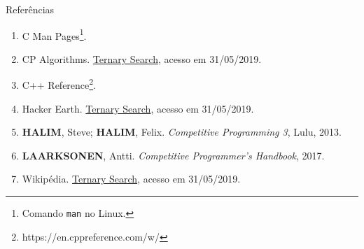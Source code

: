 \begin{frame}[fragile]{Referências}

    \begin{enumerate}
        \item C Man Pages\footnote{Comando \texttt{man} no Linux.}.

        \item CP Algorithms. \href{https://cp-algorithms.com/num_methods/ternary_search.html}{Ternary Search}, acesso em 31/05/2019.

		\item C++ Reference\footnote{https://en.cppreference.com/w/}.

        \item Hacker Earth. \href{https://www.hackerearth.com/pt-br/practice/algorithms/searching/ternary-search/tutorial/}{Ternary Search}, acesso em 31/05/2019.

        \item \textbf{HALIM}, Steve; \textbf{HALIM}, Felix. \textit{Competitive Programming 3}, Lulu, 2013.

        \item \textbf{LAARKSONEN}, Antti. \textit{Competitive Programmer's Handbook}, 2017.

        \item Wikipédia. \href{https://en.wikipedia.org/wiki/Ternary_search}{Ternary Search}, acesso em 31/05/2019.
    \end{enumerate}

\end{frame}
